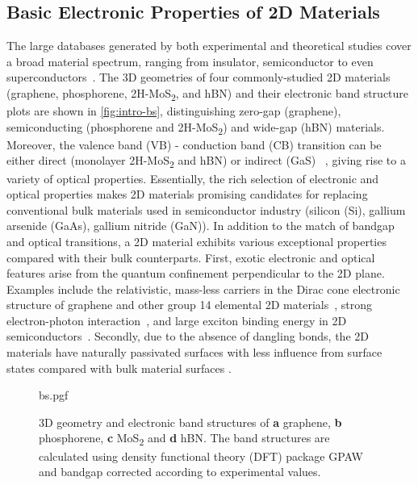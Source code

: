 \subsection{Basic Electronic Properties of 2D Materials}
\label{sec:basic-electr-prop}

The large databases generated by both
experimental and theoretical studies cover a broad material spectrum,
ranging from insulator, semiconductor to even
superconductors~\autocite{Novoselov_2016_vdW}.
%
The 3D geometries of four commonly-studied 2D materials (graphene,
phosphorene, 2H-MoS\textsubscript{2}, and hBN) and their electronic
band structure plots are shown in \autoref{fig:intro-bs}, distinguishing
zero-gap (graphene), semiconducting (phosphorene and
2H-MoS\textsubscript{2}) and wide-gap (hBN) materials.
%
Moreover, the valence band (VB) - conduction band (CB) transition can
be either direct (monolayer 2H-MoS\textsubscript{2} and hBN) or
indirect (GaS) ~\autocite{Xia_2014_2D_nanophoto_rev}, giving rise to a
variety of optical properties.
%
Essentially, the rich selection of electronic and optical properties
makes 2D materials promising candidates for replacing conventional
bulk materials used in semiconductor industry (\eg silicon (Si),
gallium arsenide (GaAs), gallium nitride (GaN)).
%
In addition to the match of bandgap and optical transitions, a 2D
material exhibits various exceptional properties compared with their
bulk counterparts.
%
First, exotic electronic and optical features arise from the quantum
confinement perpendicular to the 2D plane.
%
Examples include the relativistic, mass-less carriers in the Dirac
cone electronic structure of graphene and other group 14 elemental 2D
materials~\autocite{Novoselov_2005_massless,Zhang_2005_QHE,Das_Sarma_2011_electron_gr},
strong electron-photon
interaction~\nocite{Nair_2008_transparent,Eda_2013_rev_opt}, and large
exciton binding energy in 2D
semiconductors~\autocite{Mak_2010_mos2,Arnaud_2006_exc_hBN}.
%
Secondly, due to the absence of dangling bonds, the 2D materials have
naturally passivated surfaces with less influence from surface states
compared with bulk material surfaces
\autocite{Novoselov_2016_vdW,Liu_2016_rev}.


\begin{figure}[!htbp]
  \centering
  {bs.pgf}
  \caption{\label{fig:intro-bs} %
    3D geometry and electronic band structures of \textbf{a} graphene,
    \textbf{b} phosphorene, \textbf{c} MoS\textsubscript{2} and
    \textbf{d} hBN. The band structures are calculated using density
    functional theory (DFT) package GPAW~\autocite{Mortensen_2005_gpaw}
    and bandgap corrected according to experimental values.}
\end{figure}

